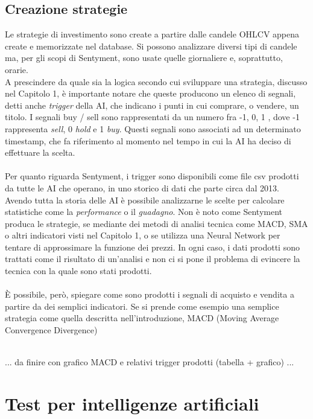\documentclass[a4paper,12pt]{report}
\begin{document}
\section{Creazione strategie}
Le strategie di investimento sono create a partire dalle candele OHLCV appena create e memorizzate nel database. Si possono analizzare diversi tipi di candele ma, per gli scopi di Sentyment, sono usate quelle giornaliere e, soprattutto, orarie.\\ A prescindere da quale sia la logica secondo cui sviluppare una strategia, discusso nel Capitolo 1, è importante notare che queste producono un elenco di segnali, detti anche \textit{trigger} della AI, che indicano i punti in cui comprare, o vendere, un titolo. I segnali buy / sell sono rappresentati da un numero fra { -1, 0, 1 }, dove -1 rappresenta \textit{sell}, 0 \textit{hold} e 1 \textit{buy}. Questi segnali sono associati ad un determinato timestamp, che fa riferimento al momento nel tempo in cui la AI ha deciso di effettuare la scelta.\\~\\ Per quanto riguarda Sentyment, i trigger sono disponibili come file csv prodotti da tutte le AI che operano, in uno storico di dati che parte circa dal 2013. Avendo tutta la storia delle AI è possibile analizzarne le scelte per calcolare statistiche come la \textit{performance} o il \textit{guadagno}. Non è noto come Sentyment produca le strategie, se mediante dei metodi di analisi tecnica come MACD, SMA o altri indicatori visti nel Capitolo 1, o se utilizza una Neural Network per tentare di approssimare la funzione dei prezzi. In ogni caso, i dati prodotti sono trattati come il risultato di un'analisi e non ci si pone il problema di evincere la tecnica con la quale sono stati prodotti. \\~\\ È possibile, però, spiegare come sono prodotti i segnali di acquisto e vendita a partire da dei semplici indicatori. Se si prende come esempio una semplice strategia come quella descritta nell'introduzione, MACD (Moving Average Convergence Divergence)

\\... da finire con grafico MACD e relativi trigger prodotti (tabella + grafico) ...



\newpage
\chapter{Test per intelligenze artificiali}	
\label{cap4}
\end{document}
